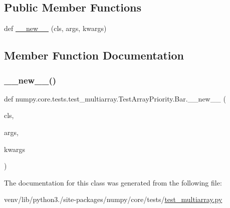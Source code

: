 \subsection*{Public Member Functions}
\begin{DoxyCompactItemize}
\item 
def \hyperlink{classnumpy_1_1core_1_1tests_1_1test__multiarray_1_1TestArrayPriority_1_1Bar_aeb22e950cc82b6e8928f7c3a37c24f85}{\+\_\+\+\_\+new\+\_\+\+\_\+} (cls, args, kwargs)
\end{DoxyCompactItemize}


\subsection{Member Function Documentation}
\mbox{\label{classnumpy_1_1core_1_1tests_1_1test__multiarray_1_1TestArrayPriority_1_1Bar_aeb22e950cc82b6e8928f7c3a37c24f85}} 
\subsubsection{\texorpdfstring{\+\_\+\+\_\+new\+\_\+\+\_\+()}{\_\_new\_\_()}}
{\footnotesize\ttfamily def numpy.\+core.\+tests.\+test\+\_\+multiarray.\+Test\+Array\+Priority.\+Bar.\+\_\+\+\_\+new\+\_\+\+\_\+ (\begin{DoxyParamCaption}\item[{}]{cls,  }\item[{}]{args,  }\item[{}]{kwargs }\end{DoxyParamCaption})}



The documentation for this class was generated from the following file\+:\begin{DoxyCompactItemize}
\item 
venv/lib/python3./site-\/packages/numpy/core/tests/\hyperlink{core_2tests_2test__multiarray_8py}{test\+\_\+multiarray.\+py}\end{DoxyCompactItemize}
